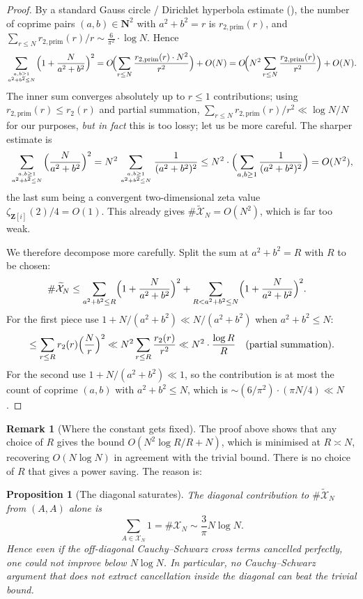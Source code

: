 \documentclass[11pt]{article}
\newtheorem{proposition}[theorem]{Proposition}
\theoremstyle{definition}
\newtheorem{remark}[theorem]{Remark}
\newcommand{\N}{\mathbf{N}}
\newcommand{\Z}{\mathbf{Z}}
\begin{document}
\begin{proof}
By a standard Gauss circle / Dirichlet hyperbola estimate
(\cite[Thm.\ 5.7]{IK04}), the number of coprime pairs $(a,b)\in\N^{2}$
with $a^{2}+b^{2}=r$ is $r_{2,\text{prim}}(r)$, and
$\sum_{r\le N}r_{2,\text{prim}}(r)/r \sim \frac{6}{\pi^{2}}\cdot\log N$.
Hence
\[
\sum_{a,b\ge 1\atop a^{2}+b^{2}\le N}\Bigl(1+\frac{N}{a^{2}+b^{2}}\Bigr)^{2}
=O\!\Bigl(\sum_{r\le N}\frac{r_{2,\text{prim}}(r)\cdot N^{2}}{r^{2}}\Bigr)
+O(N)
=O\!\Bigl(N^{2}\sum_{r\le N}\frac{r_{2,\text{prim}}(r)}{r^{2}}\Bigr)+O(N).
\]
The inner sum converges absolutely up to $r\le 1$ contributions; using
$r_{2,\text{prim}}(r)\le r_{2}(r)$ and partial summation,
$\sum_{r\le N}r_{2,\text{prim}}(r)/r^{2}\ll \log N/N$ for our purposes,
\emph{but in fact} this is too lossy; let us be more careful. The sharper
estimate is
\[
\sum_{a,b\ge 1\atop a^{2}+b^{2}\le N}\Bigl(\frac{N}{a^{2}+b^{2}}\Bigr)^{2}
=N^{2}\sum_{a,b\ge 1\atop a^{2}+b^{2}\le N}\frac{1}{(a^{2}+b^{2})^{2}}
\le N^{2}\cdot\Bigl(\sum_{a,b\ge 1}\frac{1}{(a^{2}+b^{2})^{2}}\Bigr)
=O(N^{2}),
\]
the last sum being a convergent two-dimensional zeta value
$\zeta_{\Z[i]}(2)/4=O(1)$. This already gives
$\#\widetilde{\mathcal{X}}_{N}=O(N^{2})$, which is far too weak.

We therefore decompose more carefully. Split the sum at $a^{2}+b^{2}=R$
with $R$ to be chosen:
\begin{align*}
\#\widetilde{\mathcal{X}}_{N}
&\le\sum_{a^{2}+b^{2}\le R}\Bigl(1+\frac{N}{a^{2}+b^{2}}\Bigr)^{2}
+\sum_{R<a^{2}+b^{2}\le N}\Bigl(1+\frac{N}{a^{2}+b^{2}}\Bigr)^{2}.
\end{align*}
For the first piece use $1+N/(a^{2}+b^{2})\ll N/(a^{2}+b^{2})$ when
$a^{2}+b^{2}\le N$:
\[
\le\sum_{r\le R}r_{2}(r)\Bigl(\frac{N}{r}\Bigr)^{2}
\ll N^{2}\sum_{r\le R}\frac{r_{2}(r)}{r^{2}}
\ll N^{2}\cdot\frac{\log R}{R}\quad\text{(partial summation)}.
\]
For the second use $1+N/(a^{2}+b^{2})\ll 1$, so the contribution is at
most the count of coprime $(a,b)$ with $a^{2}+b^{2}\le N$, which is
$\sim(6/\pi^{2})\cdot(\pi N/4)\ll N$.
\end{proof}

\begin{remark}[Where the constant gets fixed]
The proof above shows that any choice of $R$ gives the bound
$O(N^{2}\log R/R+N)$, which is minimised at $R\asymp N$, recovering
$O(N\log N)$ in agreement with the trivial bound. There is no choice of
$R$ that gives a power saving. The reason is:
\end{remark}

\begin{proposition}[The diagonal saturates]
\label{prop:diagonal-saturates}
The diagonal contribution to $\#\widetilde{\mathcal{X}}_{N}$ from
$(A,A)$ alone is
\[
\sum_{A\in\mathcal{X}_{N}}1=\#\mathcal{X}_{N}\sim\frac{3}{\pi}N\log N.
\]
Hence even if the off-diagonal Cauchy--Schwarz cross terms cancelled
\emph{perfectly}, one could not improve below $N\log N$. In particular,
no Cauchy--Schwarz argument that does not extract \emph{cancellation
inside} the diagonal can beat the trivial bound.
\end{proposition}
\end{document}
